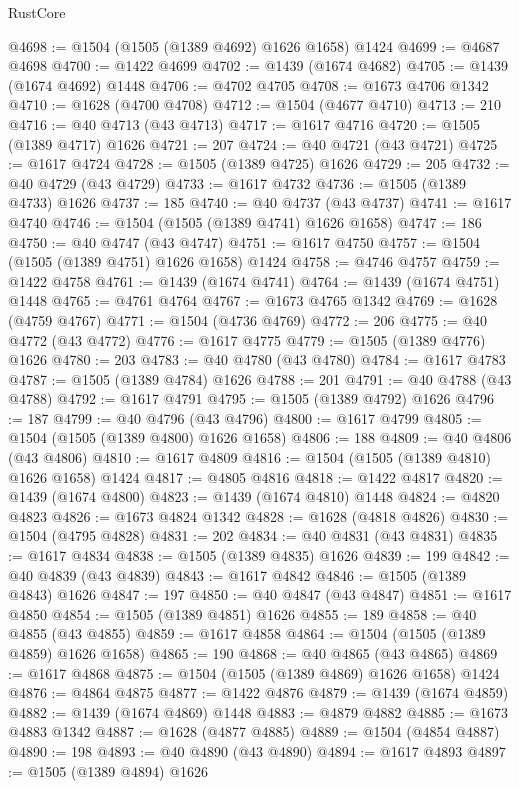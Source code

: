 \begin{lexlean}{RustCore}
\begin{coremodule}
@4698 := @1504 (@1505 (@1389 @4692) @1626 @1658) @1424
@4699 := @4687 @4698
@4700 := @1422 @4699
@4702 := @1439 (@1674 @4682)
@4705 := @1439 (@1674 @4692) @1448
@4706 := @4702 @4705
@4708 := @1673 @4706 @1342
@4710 := @1628 (@4700 @4708)
@4712 := @1504 (@4677 @4710)
@4713 := 210
@4716 := @40 @4713 (@43 @4713)
@4717 := @1617 @4716
@4720 := @1505 (@1389 @4717) @1626
@4721 := 207
@4724 := @40 @4721 (@43 @4721)
@4725 := @1617 @4724
@4728 := @1505 (@1389 @4725) @1626
@4729 := 205
@4732 := @40 @4729 (@43 @4729)
@4733 := @1617 @4732
@4736 := @1505 (@1389 @4733) @1626
@4737 := 185
@4740 := @40 @4737 (@43 @4737)
@4741 := @1617 @4740
@4746 := @1504 (@1505 (@1389 @4741) @1626 @1658)
@4747 := 186
@4750 := @40 @4747 (@43 @4747)
@4751 := @1617 @4750
@4757 := @1504 (@1505 (@1389 @4751) @1626 @1658) @1424
@4758 := @4746 @4757
@4759 := @1422 @4758
@4761 := @1439 (@1674 @4741)
@4764 := @1439 (@1674 @4751) @1448
@4765 := @4761 @4764
@4767 := @1673 @4765 @1342
@4769 := @1628 (@4759 @4767)
@4771 := @1504 (@4736 @4769)
@4772 := 206
@4775 := @40 @4772 (@43 @4772)
@4776 := @1617 @4775
@4779 := @1505 (@1389 @4776) @1626
@4780 := 203
@4783 := @40 @4780 (@43 @4780)
@4784 := @1617 @4783
@4787 := @1505 (@1389 @4784) @1626
@4788 := 201
@4791 := @40 @4788 (@43 @4788)
@4792 := @1617 @4791
@4795 := @1505 (@1389 @4792) @1626
@4796 := 187
@4799 := @40 @4796 (@43 @4796)
@4800 := @1617 @4799
@4805 := @1504 (@1505 (@1389 @4800) @1626 @1658)
@4806 := 188
@4809 := @40 @4806 (@43 @4806)
@4810 := @1617 @4809
@4816 := @1504 (@1505 (@1389 @4810) @1626 @1658) @1424
@4817 := @4805 @4816
@4818 := @1422 @4817
@4820 := @1439 (@1674 @4800)
@4823 := @1439 (@1674 @4810) @1448
@4824 := @4820 @4823
@4826 := @1673 @4824 @1342
@4828 := @1628 (@4818 @4826)
@4830 := @1504 (@4795 @4828)
@4831 := 202
@4834 := @40 @4831 (@43 @4831)
@4835 := @1617 @4834
@4838 := @1505 (@1389 @4835) @1626
@4839 := 199
@4842 := @40 @4839 (@43 @4839)
@4843 := @1617 @4842
@4846 := @1505 (@1389 @4843) @1626
@4847 := 197
@4850 := @40 @4847 (@43 @4847)
@4851 := @1617 @4850
@4854 := @1505 (@1389 @4851) @1626
@4855 := 189
@4858 := @40 @4855 (@43 @4855)
@4859 := @1617 @4858
@4864 := @1504 (@1505 (@1389 @4859) @1626 @1658)
@4865 := 190
@4868 := @40 @4865 (@43 @4865)
@4869 := @1617 @4868
@4875 := @1504 (@1505 (@1389 @4869) @1626 @1658) @1424
@4876 := @4864 @4875
@4877 := @1422 @4876
@4879 := @1439 (@1674 @4859)
@4882 := @1439 (@1674 @4869) @1448
@4883 := @4879 @4882
@4885 := @1673 @4883 @1342
@4887 := @1628 (@4877 @4885)
@4889 := @1504 (@4854 @4887)
@4890 := 198
@4893 := @40 @4890 (@43 @4890)
@4894 := @1617 @4893
@4897 := @1505 (@1389 @4894) @1626

\end{coremodule}
\end{lexlean}
